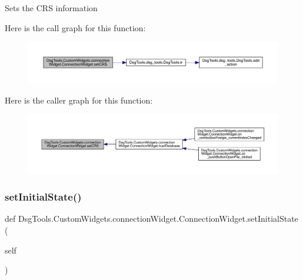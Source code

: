 \begin{DoxyVerb}Sets the CRS information
\end{DoxyVerb}
 Here is the call graph for this function\+:
\nopagebreak
\begin{figure}[H]
\begin{center}
\leavevmode
\includegraphics[width=350pt]{class_dsg_tools_1_1_custom_widgets_1_1connection_widget_1_1_connection_widget_a33b3f9d4a7fa240bda00d7d874e7fa49_cgraph}
\end{center}
\end{figure}
Here is the caller graph for this function\+:
\nopagebreak
\begin{figure}[H]
\begin{center}
\leavevmode
\includegraphics[width=350pt]{class_dsg_tools_1_1_custom_widgets_1_1connection_widget_1_1_connection_widget_a33b3f9d4a7fa240bda00d7d874e7fa49_icgraph}
\end{center}
\end{figure}
\mbox{\label{class_dsg_tools_1_1_custom_widgets_1_1connection_widget_1_1_connection_widget_a28b6fab24dc11d1aa3d81b5e22cd80bb}} 
\subsubsection{\texorpdfstring{set\+Initial\+State()}{setInitialState()}}
{\footnotesize\ttfamily def Dsg\+Tools.\+Custom\+Widgets.\+connection\+Widget.\+Connection\+Widget.\+set\+Initial\+State (\begin{DoxyParamCaption}\item[{}]{self }\end{DoxyParamCaption})}

